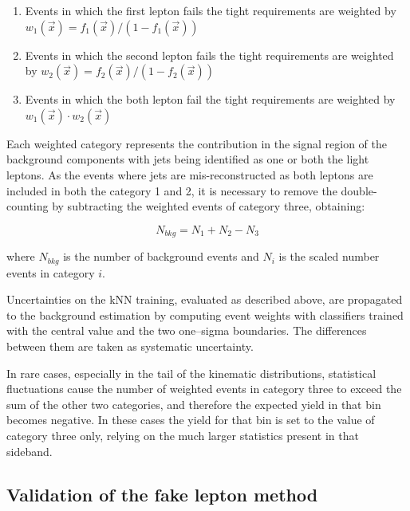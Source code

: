 \begin{enumerate}
\item Events in which the first lepton fails the tight requirements are weighted by $w_1(\vec{x}) = f_1(\vec{x})/(1-f_1(\vec{x}))$
\item Events in which the second lepton fails the tight requirements are weighted by $w_2(\vec{x}) = f_2(\vec{x})/(1-f_2(\vec{x}))$
\item Events in which the both lepton fail the tight requirements are weighted by $w_1(\vec{x}) \cdot w_2(\vec{x})$
\end{enumerate}

Each weighted category represents the contribution in the signal region of the background components with jets being identified as one or both the light leptons. As the events where jets are mis-reconstructed as both leptons are included in both the category 1 and 2, it is necessary to remove the double-counting by subtracting the weighted events of category three, obtaining:

\begin{equation}
N_{bkg} = N_1 + N_2 - N_3
\end{equation}

where $N_{bkg}$ is the number of background events and $N_i$ is the scaled number events in category $i$.

Uncertainties on the kNN training, evaluated as described above, are propagated to the background estimation by computing event weights with classifiers trained with the central value and the two one--sigma boundaries. The differences between them are taken as systematic uncertainty.

In rare cases, especially in the tail of the kinematic distributions, statistical fluctuations cause the number of weighted events in category three to exceed the sum of the other two categories, and therefore the expected yield in that bin becomes negative. In these cases the yield for that bin is set to the value of category three only, relying on the much larger statistics present in that sideband.


%

\subsection{Validation of the fake lepton method}

